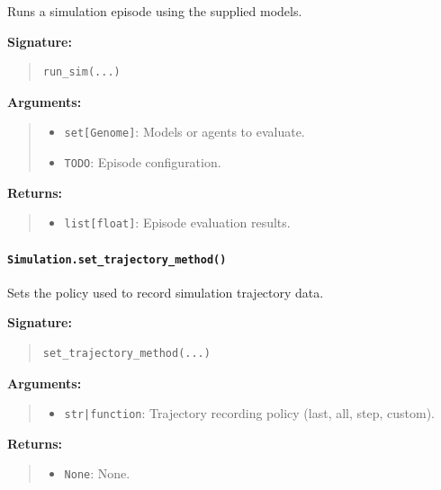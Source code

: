\documentclass[11pt]{article}
\begin{document}
Runs a simulation episode using the supplied models.

\textbf{Signature:}
\begin{quote}
\begin{verbatim}
run_sim(...)
\end{verbatim}
\end{quote}

\textbf{Arguments:}
\begin{quote}
\begin{itemize}
    \item \texttt{set[Genome]}: Models or agents to evaluate.
    \item \texttt{TODO}: Episode configuration.
\end{itemize}
\end{quote}

\textbf{Returns:}
\begin{quote}
\begin{itemize}
    \item \texttt{list[float]}: Episode evaluation results.
\end{itemize}
\end{quote}

\paragraph{\texttt{Simulation.set\_trajectory\_method()}}

Sets the policy used to record simulation trajectory data.

\textbf{Signature:}
\begin{quote}
\begin{verbatim}
set_trajectory_method(...)
\end{verbatim}
\end{quote}

\textbf{Arguments:}
\begin{quote}
\begin{itemize}
    \item \texttt{str|function}: Trajectory recording policy (last, all, step, custom).
\end{itemize}
\end{quote}

\textbf{Returns:}
\begin{quote}
\begin{itemize}
    \item \texttt{None}: None.
\end{itemize}
\end{quote}
\end{document}
